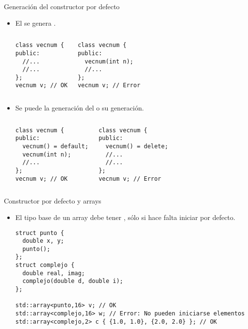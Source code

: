 \begin{frame}[t,fragile]{Generación del constructor por defecto}
\begin{itemize}
  \item El  se genera 
        .

\begin{columns}[T]
\begin{lstlisting}
class vecnum {
public:
  //...
  //...
};
vecnum v; // OK
\end{lstlisting}

\begin{lstlisting}
class vecnum {
public:
  vecnum(int n);
  //...
};
vecnum v; // Error
\end{lstlisting}

\end{columns}

\item Se puede  la generación del  o
       su generación.

\begin{columns}[T]
\begin{lstlisting}
class vecnum {
public:
  vecnum() = default;
  vecnum(int n);
  //...
};
vecnum v; // OK
\end{lstlisting}

\begin{lstlisting}
class vecnum {
public:
  vecnum() = delete;
  //...
  //...
};
vecnum v; // Error
\end{lstlisting}

\end{columns}

\end{itemize}
\end{frame}

\begin{frame}[t,fragile]{Constructor por defecto y arrays}
\begin{itemize}
  \item El tipo base de un array debe tener , 
        sólo si hace falta iniciar por defecto.
\begin{lstlisting}
struct punto {
  double x, y;
  punto();
};
struct complejo {
  double real, imag;
  complejo(double d, double i);
};

std::array<punto,16> v; // OK
std::array<complejo,16> w; // Error: No pueden iniciarse elementos
std::array<complejo,2> c { {1.0, 1.0}, {2.0, 2.0} }; // OK 
\end{lstlisting}
\end{itemize}
\end{frame}


